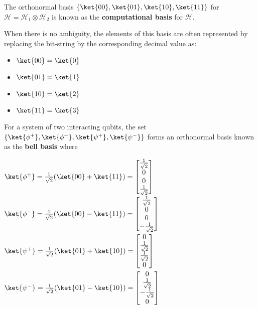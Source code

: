 \begin{defn}
    The orthonormal basis $\{ \ket{00}, \ket{01}, \ket{10}, \ket{11} \}$ for $\mathcal{H} = \mathcal{H}_1 \otimes \mathcal{H}_2$ is known as the \textbf{computational basis} for $\mathcal{H}$.

    When there is no ambiguity, the elements of this basis are often represented by replacing the bit-string by the corresponding decimal value as:

    \begin{itemize}
        \item $\ket{00} = \ket{0}$
        \item $\ket{01} = \ket{1}$
        \item $\ket{10} = \ket{2}$
        \item $\ket{11} = \ket{3}$
    \end{itemize}

\end{defn}

\begin{defn}
    For a system of two interacting qubits, the set $\{ \ket{\phi^+}, \ket{\phi^-}, \ket{\psi^+}, \ket{\psi^-} \}$ forms an orthonormal basis known as the \textbf{bell basis} where 

    $\ket{\phi^+} = \frac{1}{\sqrt{2}} (\ket{00} + \ket{11}) = \begin{bmatrix} \frac{1}{\sqrt{2}} \\ 0 \\ 0 \\ \frac{1}{\sqrt{2}} \end{bmatrix}$
    $\ket{\phi^-} = \frac{1}{\sqrt{2}} (\ket{00} - \ket{11}) = \begin{bmatrix} \frac{1}{\sqrt{2}} \\ 0 \\ 0 \\ - \frac{1}{\sqrt{2}} \end{bmatrix}$
        $\ket{\psi^+} = \frac{1}{\sqrt{2}} (\ket{01} + \ket{10}) = \begin{bmatrix} 0 \\ \frac{1}{\sqrt{2}} \\ \frac{1}{\sqrt{2}} \\0 \end{bmatrix}$
        $\ket{\psi^-} = \frac{1}{\sqrt{2}} (\ket{01} - \ket{10}) = \begin{bmatrix} 0 \\ \frac{1}{\sqrt{2}} \\ - \frac{1}{\sqrt{2}} \\0 \end{bmatrix}$
\end{defn}

